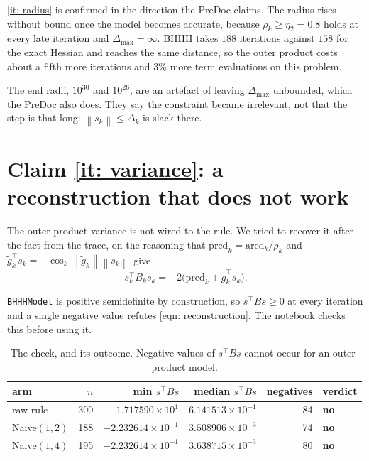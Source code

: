 \documentclass[11pt,a4paper]{article}
\providecommand{\norm}[1]{\left \lVert #1 \right \rVert}
\newcommand{\NO}{\textcolor{red!70!black}{\textbf{no}}}
\begin{document}
\ref{it: radius} is confirmed in the direction the PreDoc claims. The radius rises
without bound once the model becomes accurate, because $\rho_k \geq \eta_2 = 0.8$
holds at every late iteration and $\Delta_{\max} = \infty$. BHHH takes $188$
iterations against $158$ for the exact Hessian and reaches the same distance, so
the outer product costs about a fifth more iterations and $3\%$ more term
evaluations on this problem.

The end radii, $10^{30}$ and $10^{26}$, are an artefact of leaving
$\Delta_{\max}$ unbounded, which the PreDoc also does. They say the constraint
became irrelevant, not that the step is that long: $\norm{s_k} \leq \Delta_k$ is
slack there.

\section{Claim \ref{it: variance}: a reconstruction that does not work}
\label{sec: refuted}

The outer-product variance is not wired to the rule. We tried to recover it after
the fact from the trace, on the reasoning that
$\mathrm{pred}_k = \mathrm{ared}_k/\rho_k$ and
$\tilde g_k^{\!\top}s_k = -\cos_k\norm{\tilde g_k}\norm{s_k}$ give
\begin{equation}
  s_k^{\!\top}\tilde B_k s_k = -2\bigl(\mathrm{pred}_k + \tilde g_k^{\!\top}s_k\bigr).
  \label{eqn: reconstruction}
\end{equation}

\texttt{BHHHModel} is positive semidefinite by construction, so
$s^{\!\top}Bs \geq 0$ at every iteration and a single negative value refutes
\eqref{eqn: reconstruction}. The notebook checks this before using it.

\begin{table}[H]
  \centering\small
  \caption{The check, and its outcome. Negative values of $s^{\!\top}Bs$ cannot
    occur for an outer-product model.}
  \label{tab: refuted}
  \begin{tabular}{lrrrrl}
    \toprule
    arm & $n$ & min $s^{\!\top}Bs$ & median $s^{\!\top}Bs$ & negatives & verdict \\
    \midrule
    raw rule     & 300 & $-1.717590\times10^{1}$  & $6.141513\times10^{-1}$ & 84 & \NO \\
    Naive$(1,2)$ & 188 & $-2.232614\times10^{-1}$ & $3.508906\times10^{-3}$ & 74 & \NO \\
    Naive$(1,4)$ & 195 & $-2.232614\times10^{-1}$ & $3.638715\times10^{-3}$ & 80 & \NO \\
    \bottomrule
  \end{tabular}
\end{table}
\end{document}
